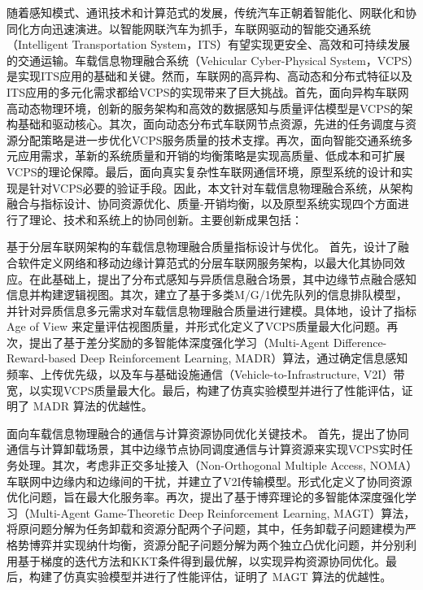 \begin{cabstract}	%

随着感知模式、通讯技术和计算范式的发展，传统汽车正朝着智能化、网联化和协同化方向迅速演进。以智能网联汽车为抓手，车联网驱动的智能交通系统（Intelligent Transportation System，ITS）有望实现更安全、高效和可持续发展的交通运输。车载信息物理融合系统（Vehicular Cyber-Physical System，VCPS）是实现ITS应用的基础和关键。然而，车联网的高异构、高动态和分布式特征以及ITS应用的多元化需求都给VCPS的实现带来了巨大挑战。首先，面向异构车联网高动态物理环境，创新的服务架构和高效的数据感知与质量评估模型是VCPS的架构基础和驱动核心。其次，面向动态分布式车联网节点资源，先进的任务调度与资源分配策略是进一步优化VCPS服务质量的技术支撑。再次，面向智能交通系统多元应用需求，革新的系统质量和开销的均衡策略是实现高质量、低成本和可扩展VCPS的理论保障。最后，面向真实复杂性车联网通信环境，原型系统的设计和实现是针对VCPS必要的验证手段。因此，本文针对车载信息物理融合系统，从架构融合与指标设计、协同资源优化、质量-开销均衡，以及原型系统实现四个方面进行了理论、技术和系统上的协同创新。主要创新成果包括：

 基于分层车联网架构的车载信息物理融合质量指标设计与优化。
首先，设计了融合软件定义网络和移动边缘计算范式的分层车联网服务架构，以最大化其协同效应。在此基础上，提出了分布式感知与异质信息融合场景，其中边缘节点融合感知信息并构建逻辑视图。其次，建立了基于多类M/G/1优先队列的信息排队模型，并针对异质信息多元需求对车载信息物理融合质量进行建模。具体地，设计了指标 Age of View 来定量评估视图质量，并形式化定义了VCPS质量最大化问题。再次，提出了基于差分奖励的多智能体深度强化学习（Multi-Agent Difference-Reward-based Deep Reinforcement Learning, MADR）算法，通过确定信息感知频率、上传优先级，以及车与基础设施通信（Vehicle-to-Infrastructure, V2I）带宽，以实现VCPS质量最大化。最后，构建了仿真实验模型并进行了性能评估，证明了 MADR 算法的优越性。

 面向车载信息物理融合的通信与计算资源协同优化关键技术。
首先，提出了协同通信与计算卸载场景，其中边缘节点协同调度通信与计算资源来实现VCPS实时任务处理。其次，考虑非正交多址接入（Non-Orthogonal Multiple Access, NOMA）车联网中边缘内和边缘间的干扰，并建立了V2I传输模型。形式化定义了协同资源优化问题，旨在最大化服务率。再次，提出了基于博弈理论的多智能体深度强化学习（Multi-Agent Game-Theoretic Deep Reinforcement Learning, MAGT）算法，将原问题分解为任务卸载和资源分配两个子问题，其中，任务卸载子问题建模为严格势博弈并实现纳什均衡，资源分配子问题分解为两个独立凸优化问题，并分别利用基于梯度的迭代方法和KKT条件得到最优解，以实现异构资源协同优化。最后，构建了仿真实验模型并进行了性能评估，证明了 MAGT 算法的优越性。


\end{cabstract}
